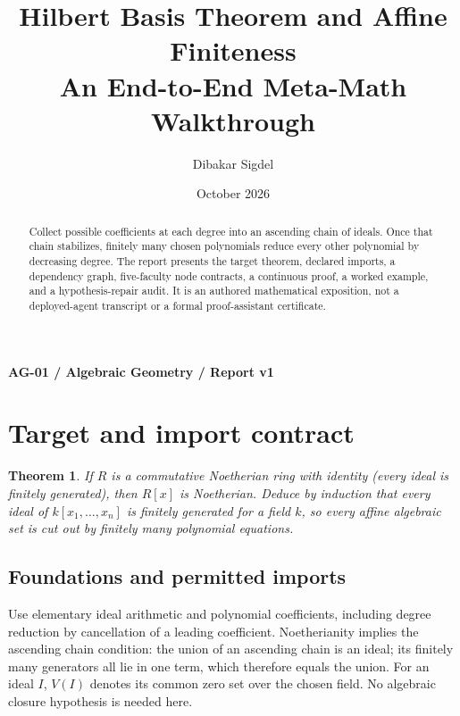 \documentclass[preprint,12pt,aps,pra,showkeys,amsmath,amssymb,superscriptaddress,floatfix]{revtex4-2}
\newtheorem{theorem}{Theorem}[section]
\theoremstyle{definition}
\theoremstyle{remark}
\begin{document}
\title{Hilbert Basis Theorem and Affine Finiteness\\[4pt]\large An End-to-End Meta-Math Walkthrough}

\author{Dibakar Sigdel}


\date{October 2026}

\begin{abstract}

Collect possible coefficients at each degree into an ascending chain of
ideals. Once that chain stabilizes, finitely many chosen polynomials
reduce every other polynomial by decreasing degree. The report presents
the target theorem, declared imports, a dependency graph, five-faculty
node contracts, a continuous proof, a worked example, and a
hypothesis-repair audit. It is an authored mathematical exposition, not
a deployed-agent transcript or a formal proof-assistant certificate.

\end{abstract}\maketitle\linespread{1.12}\selectfont

\noindent\textbf{AG-01 / Algebraic Geometry / Report v1}

\section{Target and import contract}

\begin{theorem}

If \(R\) is a commutative Noetherian ring with identity (every ideal is
finitely generated), then \(R[x]\) is Noetherian. Deduce by induction
that every ideal of \(k[x_1,\ldots,x_n]\) is finitely generated for a
field \(k\), so every affine algebraic set is cut out by finitely many
polynomial equations.

\end{theorem}

\subsection{Foundations and permitted imports}

Use elementary ideal arithmetic and polynomial coefficients, including
degree reduction by cancellation of a leading coefficient. Noetherianity
implies the ascending chain condition: the union of an ascending chain
is an ideal; its finitely many generators all lie in one term, which
therefore equals the union. For an ideal \(I\), \(V(I)\) denotes its
common zero set over the chosen field. No algebraic closure hypothesis
is needed here.
\end{document}
